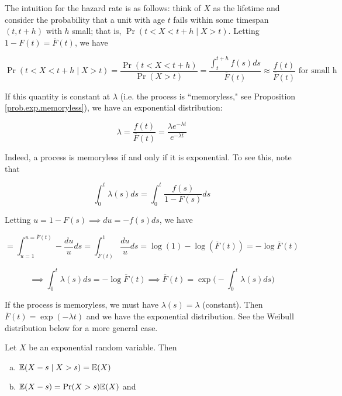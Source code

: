 \begin{itemize}
\begin{remark}
The intuition for the hazard rate is as follows: think of \(X\) as the lifetime and consider the probability that a unit with age \(t\) fails within some timespan \((t, t+h)\) with \(h\) small; that is, \(\Pr(t < X < t+h \mid X > t)\). Letting \(1 - F(t) = \overline{F}(t)\), we have

\[
\Pr(t < X < t+h \mid X > t) = \frac{\Pr(t < X < t + h)}{\Pr(X > t)} =  \frac{\int_t^{t+h}f(s)ds }{\overline{F}(t)} \approx \frac{f(t)}{\overline{F}(t)} \text{ for small h}
\]

If this quantity is constant at \(\lambda\) (i.e. the process is ``memoryless," see Proposition \ref{prob.exp.memoryless}), we have an exponential distribution:

\[
\lambda =  \frac{f(t)}{\overline{F}(t)} = \frac{\lambda e^{-\lambda t}}{e^{-\lambda t}}
\]

Indeed, a process is memoryless if and only if it is exponential. To see this, note that 

\[
\int_0^t \lambda(s) ds = \int_0 ^t \frac{f(s)}{1 - F(s)} ds 
\]

Letting \(u = 1 - F(s) \implies du = - f(s)ds\), we have

\[
=  \int_{u=1}^{u=\overline{F}(t)} - \frac{du}{u} ds  =   \int_{\overline{F}(t)}^{1}  \frac{du}{u} ds = \log(1) - \log(\overline{F}(t)) = - \log \overline{F}(t)
\]

\[
\implies \int_0^t \lambda(s) ds  = - \log \overline{F}(t) \implies \boxed{\overline{F}(t) = \exp \bigg( - \int_0^t \lambda(s) ds \bigg) }
\]

If the process is memoryless, we must have \(\lambda(s) = \lambda\) (constant). Then \(\overline{F}(t) = \exp(-\lambda t)\) and we have the exponential distribution. See the Weibull distribution below for a more general case.

\end{remark}

\begin{proposition} Let \(X\) be an exponential random variable. Then 

\begin{enumerate}[(a)]

\item  \(\mathbb{E}(X - s \mid X > s) = \mathbb{E}(X)\) 

\item \(\mathbb{E}(X - s ) = \Pr (X > s) \mathbb{E}(X)\) and



\end{enumerate}


\end{proposition}
\end{itemize}
